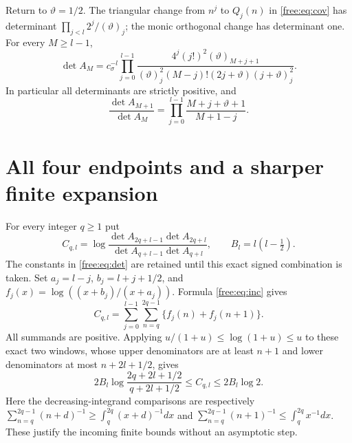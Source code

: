 Return to $\vartheta=1/2$. The triangular change from $n^j$ to $Q_j(n)$
in \eqref{free:eq:cov} has determinant $\prod_{j<l}2^j/(\vartheta)_j$;
the monic orthogonal change has determinant one. For every $M\ge l-1$,
\begin{equation}\label{free:eq:det}
 \det A_M=c_\sigma^{-l}\prod_{j=0}^{l-1}
 \frac{4^j(j!)^2(\vartheta)_{M+j+1}}
 {(\vartheta)_j^2(M-j)!(2j+\vartheta)(j+\vartheta)_j^2}.
\end{equation}
In particular all determinants are strictly positive, and
\begin{equation}\label{free:eq:inc}
 \frac{\det A_{M+1}}{\det A_M}
 =\prod_{j=0}^{l-1}\frac{M+j+\vartheta+1}{M+1-j}.
\end{equation}

\section{All four endpoints and a sharper finite expansion}
For every integer $q\ge1$ put
\[
 C_{q,l}=\log\frac{\det A_{2q+l-1}\det A_{2q+l}}
 {\det A_{q+l-1}\det A_{q+l}},\qquad B_l=l(l-\tfrac12).
\]
The constants in \eqref{free:eq:det} are retained until this exact signed
combination is taken. Set $a_j=l-j$, $b_j=l+j+1/2$, and
$f_j(x)=\log((x+b_j)/(x+a_j))$. Formula \eqref{free:eq:inc} gives
\begin{equation}\label{free:eq:windows}
 C_{q,l}=\sum_{j=0}^{l-1}\sum_{n=q}^{2q-1}
                         \{f_j(n)+f_j(n+1)\}.
\end{equation}
All summands are positive. Applying
$u/(1+u)\le\log(1+u)\le u$ to these exact two windows, whose upper
denominators are at least $n+1$ and lower denominators at most
$n+2l+1/2$, gives
\[
 2B_l\log\frac{2q+2l+1/2}{q+2l+1/2}
 \le C_{q,l}\le2B_l\log2.
\]
Here the decreasing-integrand comparisons are respectively
$\sum_{n=q}^{2q-1}(n+d)^{-1}\ge\int_q^{2q}(x+d)^{-1}dx$ and
$\sum_{n=q}^{2q-1}(n+1)^{-1}\le\int_q^{2q}x^{-1}dx$.
These justify the incoming finite bounds without an asymptotic step.


